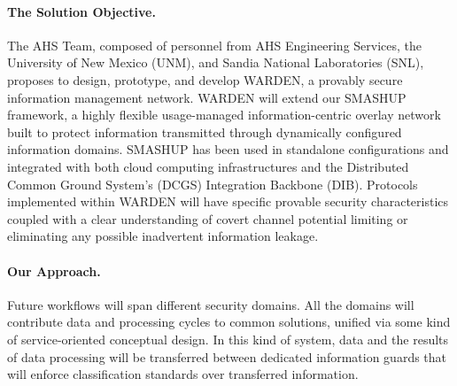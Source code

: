 \documentclass{sbir}
\begin{document}
\paragraph{The Solution Objective.} The AHS Team, composed of personnel from AHS Engineering Services, the University of New Mexico (UNM), and Sandia National Laboratories (SNL), proposes to design, prototype, and develop WARDEN, a provably secure information management network. WARDEN will extend our SMASHUP framework, a highly flexible usage-managed information-centric overlay network built to protect information transmitted through dynamically configured information domains. SMASHUP has been used in standalone configurations and integrated with both cloud computing infrastructures and the Distributed Common Ground System's (DCGS) Integration Backbone (DIB). Protocols implemented within WARDEN will have specific provable security characteristics coupled with a clear understanding of covert channel potential limiting or eliminating any possible inadvertent information leakage.
\begin{center}
\vspace{-12pt}
\end{center}

\paragraph{Our Approach.} 
Future workflows will span different security domains. All the domains will contribute data and processing cycles to common solutions, unified via some kind of service-oriented conceptual design. In this kind of system, data and the results of data processing will be transferred between dedicated information guards that will enforce classification standards over transferred information.
\end{document}
